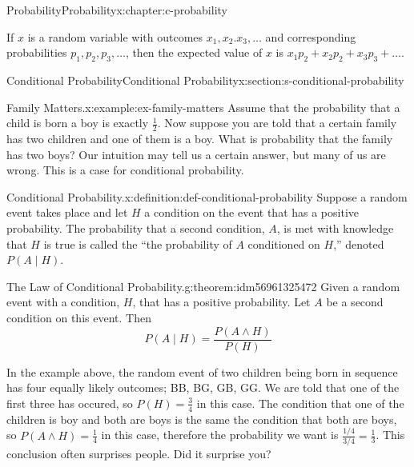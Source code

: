 \documentclass[twoside,10pt,]{book}
\numberwithin{equation}{section}
\begin{document}
\begin{chapterptx}{Probability}{}{Probability}{}{}{x:chapter:c-probability}
\begin{introduction}{}%
If \(x\) is a random variable with outcomes \(x_1, x_2. x_3, \ldots\) and corresponding probabilities \(p_1, p_2, p_3, \ldots\), then the expected value of \(x\) is \(x_1p_2+ x_2p_2+ x_3p_3+\ldots\).%
\end{introduction}%
%
%
\typeout{************************************************}
\typeout{************************************************}
%
\begin{sectionptx}{Conditional Probability}{}{Conditional Probability}{}{}{x:section:s-conditional-probability}
\begin{example}{Family Matters.}{x:example:ex-family-matters}%
Assume that the probability that a child is born a boy is exactly \(\frac{1}{2}\).  Now suppose you are told that a certain family has two children and one of them is a boy.  What is probability that the family has two boys?  Our intuition may tell us a certain answer, but many of us are wrong. This is a case for conditional probability.%
\end{example}
\begin{definition}{Conditional Probability.}{x:definition:def-conditional-probability}%
%
\label{g:notation:idm56961326048}%
Suppose a random event takes place and let \(H\) a condition on the event that has a positive probability. The probability that a second condition, \(A\), is met with knowledge that \(H\) is true is called the ``the probability of \(A\) conditioned on \(H\),'' denoted \(P(A \mid H)\).%
\end{definition}
\begin{theorem}{The Law of Conditional Probability.}{}{g:theorem:idm56961325472}%
Given a random event with a condition, \(H\), that has a positive probability. Let \(A\) be a second condition on this event.  Then%
\begin{equation*}
P(A \mid H)= \frac{P(A \wedge H)}{P(H)}
\end{equation*}
%
\end{theorem}
In the example above, the random event of two children being born in sequence has four equally likely outcomes; BB, BG, GB, GG.  We are told that one of the first three has occured, so \(P(H) =\frac{3}{4}\) in this case.   The condition that one of the children is boy and both are boys is the same the condition that both are boys, so \(P(A \wedge H) = \frac{1}{4}\) in this case, therefore the probability we want is \(\frac{1/4}{3/4} =\frac{1}{3}\).  This conclusion often surprises people.  Did it surprise you?%

\end{sectionptx}
\end{chapterptx}
\end{document}
